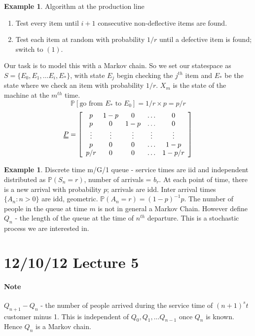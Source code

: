 \documentclass{article}
\theoremstyle{definition}
\newtheorem{ex}[thm]{Example}
\newcommand{\PP}{\mathbb{P}}
\begin{document}
\begin{ex}
Algorithm at the production line
\begin{enumerate}
\item
Test every item until $i+1$ consecutive non-deflective items are found.
\item
Test each item at random  with probability $1/r$ until a defective item is found; switch to $(1)$.
\end{enumerate}
Our task is to model this with a Markov chain. So we set our statespace as $S = \{E_0, E_1, \ldots E_i, E_{\ast} \}$, with state $E_j$ begin checking the $j^{th}$ item and $E_{\ast}$ be the state where we check an item with probability $1/r$. $X_m$ is the state of the machine at the $m^{th}$ time.
\[
\mathbb{P}[ \mbox{go from } E_{\ast} \mbox{ to } E_0 ] = 1/r \times p = p/r
\] 
\[
\uuline{P} = \left [ \begin{array}{ccccc} p & 1-p & 0 & \hdots & 0\\ p & 0 & 1 - p & \hdots & 0\\ \vdots & \vdots & \vdots & \vdots & \vdots\\ p & 0 & 0 & \hdots & 1 - p\\ p/r & 0 & 0 & \hdots & 1 - p/r \end{array} \right ]
\]
\end{ex}

\begin{ex} Discrete time m/G/1 queue - service times are iid and independent distributed as $\mathbb{P}(S_n = r)$, number of arrivals = $b_r$.  At each point of time, there is a new arrival with probability $p$; arrivals are idd. Inter arrival times $\{A_n : n > 0\}$ are idd, geometric. $\PP(A_n = r) = (1-p)^{-1}p$. The number of people in the queue at time $m$ is not in general a Markov Chain. However define\\

$Q_n$ - the length of the queue at the time of $n^{th}$ departure. This is a stochastic process we are interested in.
\end{ex}

\section{12/10/12 Lecture 5}

\paragraph*{Note} $Q_{n+1} - Q_n$ - the number of people arrived during the service time of $(n+1)^st$ customer minus 1. This is independent of $Q_0, Q_1, \ldots Q_{n-1}$ once $Q_n$ is known. Hence $Q_n$ is a Markov chain.
\end{document}
